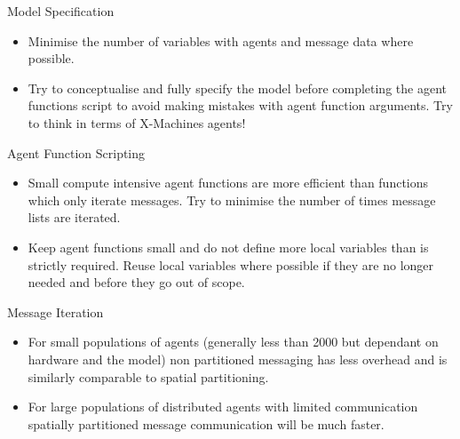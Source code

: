 \documentclass[11pt, a4paper, onecolumn, oneside]{report}
\begin{document}
Model Specification

\begin{itemize}
    \item Minimise the number of variables with agents and message data where possible.
    \item Try to conceptualise and fully specify the model before completing the agent functions script to avoid making mistakes with agent function arguments.
        Try to think in terms of X-Machines agents!
\end{itemize}

Agent Function Scripting

\begin{itemize}
    \item Small compute intensive agent functions are more efficient than functions which only iterate messages.
        Try to minimise the number of times message lists are iterated.
    \item Keep agent functions small and do not define more local variables than is strictly required.
        Reuse local variables where possible if they are no longer needed and before they go out of scope.
\end{itemize}

Message Iteration

\begin{itemize}
    \item For small populations of agents (generally less than 2000 but dependant on hardware and the model) non partitioned messaging has less overhead and is similarly comparable to spatial partitioning.
    \item For large populations of distributed agents with limited communication spatially partitioned message communication will be much faster.
\end{itemize}

% 
\end{document}
